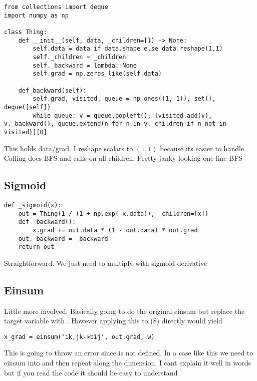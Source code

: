 \documentclass[11pt]{article}
\begin{document}
\begin{verbatim}
from collections import deque
import numpy as np

class Thing:
    def __init__(self, data, _children=[]) -> None:
        self.data = data if data.shape else data.reshape(1,1)
        self._children = _children
        self._backward = lambda: None  
        self.grad = np.zeros_like(self.data)

    def backward(self):
        self.grad, visited, queue = np.ones((1, 1)), set(), deque([self])
        while queue: v = queue.popleft(); [visited.add(v), v._backward(), queue.extend(n for n in v._children if n not in visited)][0]
\end{verbatim}
This holds data/grad. I reshape scalars to $(1, 1)$ because its easier to handle.
Calling  does BFS and calls  on all children.
Pretty janky looking one-line BFS

\subsection*{Sigmoid}
\begin{verbatim}
def _sigmoid(x):
    out = Thing(1 / (1 + np.exp(-x.data)), _children=[x])
    def _backward():
        x.grad += out.data * (1 - out.data) * out.grad
    out._backward = _backward
    return out
\end{verbatim}
Straightforward. We just need to multiply  with sigmoid derivative

\subsection*{Einsum}
Little more involved. Basically going to do the original einsum but replace the target variable
with . However applying this to (8) directly would yield 
\begin{verbatim}
x_grad = einsum('ik,jk->bij', out.grad, w)
\end{verbatim}
This is going to throw an error since  is not defined. In a case like this we need to einsum into
 and then repeat along the  dimension. I cant explain it well in words
but if you read the code it should be easy to understand
\end{document}
